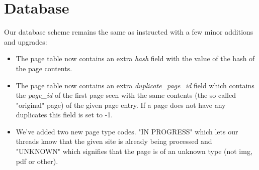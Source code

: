 \documentclass[runningheads]{llncs}
\begin{document}
\section{Database}
Our database scheme remains the same as instructed with a few minor additions and upgrades:
\begin{itemize}
\item The page table now contains an extra \textit{hash} field with the value of the hash of the page contents.
\item The page table now contains an extra \textit{duplicate\_page\_id} field which contains the \textit{page\_id} of the first page seen with the same contents (the so called "original" page) of the given page entry. If a page does not have any duplicates this field is set to -1.
\item We've added two new page type codes. "IN PROGRESS" which lets our threads know that the given site is already being processed and "UNKNOWN" which signifies that the page is of an unknown type (not img, pdf or other).

\end{itemize}
\end{document}
